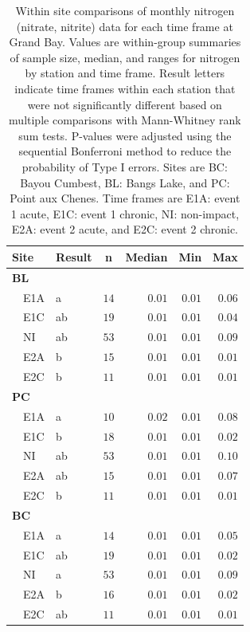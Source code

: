 \documentclass[letterpaper,12pt]{article}\usepackage[]{graphicx}\usepackage[]{color}
\begin{document}
\begin{table}[!tbp]
\caption{Within site comparisons  of monthly nitrogen (nitrate, nitrite) data for each time frame at Grand Bay.  Values are within-group summaries of sample size, median, and ranges for nitrogen by station and time frame.  Result letters indicate time frames within each station that were not significantly different based on multiple comparisons with Mann-Whitney rank sum tests.  P-values were adjusted using the sequential Bonferroni method to reduce the probability of Type I errors. Sites are BC: Bayou Cumbest, BL: Bangs Lake, and PC: Point aux Chenes.  Time frames are E1A: event 1 acute, E1C: event 1 chronic, NI: non-impact, E2A: event 2 acute, and E2C: event 2 chronic.\label{tab:tntab}} 
\begin{center}
\begin{tabular}{llrrrr}
\hline\hline
\multicolumn{1}{l}{Site}&\multicolumn{1}{c}{Result}&\multicolumn{1}{c}{n}&\multicolumn{1}{c}{Median}&\multicolumn{1}{c}{Min}&\multicolumn{1}{c}{Max}\tabularnewline
\hline
{\bfseries BL}&&&&&\tabularnewline
~~E1A&a&$14$&$0.01$&$0.01$&$0.06$\tabularnewline
~~E1C&ab&$19$&$0.01$&$0.01$&$0.04$\tabularnewline
~~NI&ab&$53$&$0.01$&$0.01$&$0.09$\tabularnewline
~~E2A&b&$15$&$0.01$&$0.01$&$0.01$\tabularnewline
~~E2C&b&$11$&$0.01$&$0.01$&$0.01$\tabularnewline
\hline
{\bfseries PC}&&&&&\tabularnewline
~~E1A&a&$10$&$0.02$&$0.01$&$0.08$\tabularnewline
~~E1C&b&$18$&$0.01$&$0.01$&$0.02$\tabularnewline
~~NI&ab&$53$&$0.01$&$0.01$&$0.10$\tabularnewline
~~E2A&ab&$15$&$0.01$&$0.01$&$0.07$\tabularnewline
~~E2C&b&$11$&$0.01$&$0.01$&$0.01$\tabularnewline
\hline
{\bfseries BC}&&&&&\tabularnewline
~~E1A&a&$14$&$0.01$&$0.01$&$0.05$\tabularnewline
~~E1C&ab&$19$&$0.01$&$0.01$&$0.02$\tabularnewline
~~NI&a&$53$&$0.01$&$0.01$&$0.09$\tabularnewline
~~E2A&b&$16$&$0.01$&$0.01$&$0.02$\tabularnewline
~~E2C&ab&$11$&$0.01$&$0.01$&$0.01$\tabularnewline
\hline
\end{tabular}\end{center}

\end{table}

\clearpage
\end{document}
